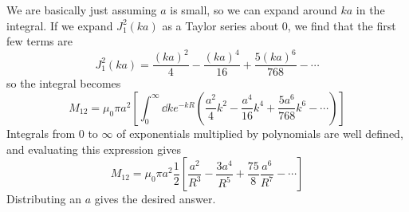 \documentclass[a4paper,twoside]{article}
\begin{document}
\begin{itemize}
\begin{equation}
        \end{equation}
        \begin{problem}
            We are basically just assuming $ a $ is small, so we can expand around $ ka $ in the integral. If we expand $ J_1^2(ka) $ as a Taylor series about $ 0 $, we find that the first few terms are
            \begin{equation}
                J_1^2(ka) = \frac{(ka)^2}{4} - \frac{(ka)^4}{16} + \frac{5(ka)^6}{768} - \cdots
            \end{equation}
            so the integral becomes
            \begin{equation}
                M_{12} = \mu_0 \pi a^2 \left[ \int_{0}^{\infty} \dd{k} e^{-kR} \left( \frac{a^2}{4} k^2 - \frac{a^4}{16} k^4 + \frac{5 a^6}{768} k^6 - \cdots  \right) \right]
            \end{equation}
            Integrals from $ 0 $ to $ \infty $ of exponentials multiplied by polynomials are well defined, and evaluating this expression gives
            \begin{equation}
                M_{12} = \mu_0 \pi a^2 \frac{1}{2} \left[\frac{a^2}{R^3} - \frac{3 a^4}{R^5} + \frac{75}{8} \frac{a^6}{R^7} - \cdots  \right]
            \end{equation}
            Distributing an $ a $ gives the desired answer.
        \end{problem}
\end{itemize}
\end{document}
